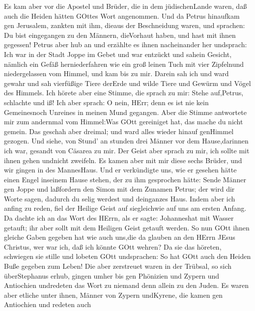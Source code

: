  Es kam aber vor die Apostel und Brüder, die in dem
jüdischenLande waren, daß auch die Heiden hätten GOttes Wort angenommen.
 Und da Petrus hinaufkam gen Jerusalem, zankten mit ihm,
dieaus der Beschneidung waren,  und sprachen: Du bist
eingegangen zu den Männern, dieVorhaut haben, und hast mit ihnen
gegessen!  Petrus aber hub an und erzählte es ihnen
nacheinander her undsprach:  Ich war in der Stadt Joppe im
Gebet und war entzückt und sahein Gesicht, nämlich ein Gefäß
herniederfahren wie ein groß leinen Tuch mit vier Zipfelnund
niedergelassen vom Himmel, und kam bis zu mir.  Darein sah
ich und ward gewahr und sah vierfüßige Tiere derErde und wilde Tiere und
Gewürm und Vögel des Himmels.  Ich hörete aber eine Stimme,
die sprach zu mir: Stehe auf,Petrus, schlachte und iß!  Ich
aber sprach: O nein, HErr; denn es ist nie kein Gemeinesnoch Unreines in
meinen Mund gegangen.  Aber die Stimme antwortete mir zum
andernmal vom Himmel:Was GOtt gereiniget hat, das mache du nicht gemein.
 Das geschah aber dreimal; und ward alles wieder hinauf
genHimmel gezogen.  Und siehe, von Stund' an stunden drei
Männer vor dem Hause,darinnen ich war, gesandt von Cäsarea zu mir.
 Der Geist aber sprach zu mir, ich sollte mit ihnen gehen
undnicht zweifeln. Es kamen aber mit mir diese sechs Brüder, und wir
gingen in des MannesHaus.  Und er verkündigte uns, wie er
gesehen hätte einen Engel inseinem Hause stehen, der zu ihm gesprochen
hätte: Sende Männer gen Joppe und laßfordern den Simon mit dem Zunamen
Petrus;  der wird dir Worte sagen, dadurch du selig werdest
und deinganzes Haus.  Indem aber ich anfing zu reden, fiel
der Heilige Geist auf siegleichwie auf uns am ersten Anfang.
 Da dachte ich an das Wort des HErrn, als er sagte:
Johanneshat mit Wasser getauft; ihr aber sollt mit dem Heiligen Geist
getauft werden.  So nun GOtt ihnen gleiche Gaben gegeben
hat wie auch uns,die da glauben an den HErrn JEsus Christus, wer war
ich, daß ich könnte GOtt wehren?  Da sie das höreten,
schwiegen sie stille und lobeten GOtt undsprachen: So hat GOtt auch den
Heiden Buße gegeben zum Leben!  Die aber zerstreuet waren
in der Trübsal, so sich überStephanus erhub, gingen umher bis gen
Phönizien und Zypern und Antiochien undredeten das Wort zu niemand denn
allein zu den Juden.  Es waren aber etliche unter ihnen,
Männer von Zypern undKyrene, die kamen gen Antiochien und redeten auch
